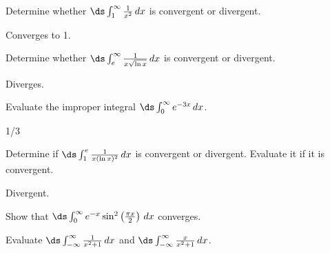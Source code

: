 \begin{enumialphparenastyle}

\begin{ex}
	Determine whether $\ds\int_1^{\infty}\frac{1}{x^2}\,dx$ is convergent or divergent.
	\begin{sol}
		Converges to 1.
	\end{sol}
\end{ex}

\begin{ex}
	Determine whether $\ds\int_e^{\infty}\frac{1}{x\sqrt{\ln x}}\,dx$ is convergent or divergent.
	\begin{sol}
		Diverges.
	\end{sol}
\end{ex}

\begin{ex}
	Evaluate the improper integral $\ds\int_0^{\infty}e^{-3x}\,dx$.
	\begin{sol}
		1/3
	\end{sol}
\end{ex}

\begin{ex}
	Determine if $\ds\int_1^e\frac{1}{x(\ln x)^2}\,dx$ is convergent or divergent. Evaluate it if it is convergent.
	\begin{sol}
		Divergent.
	\end{sol}
\end{ex}

\begin{ex}
	Show that $\ds\int_0^{\infty}e^{-x}\sin^2\left(\frac{\pi x}{2}\right)\,dx$ converges.
\end{ex}

\begin{ex}
	Evaluate $\ds\int_{-\infty}^{\infty}\frac{1}{x^2+1}\,dx$ and $\ds\int_{-\infty}^{\infty}\frac{x}{x^2+1}\,dx$.
\end{ex}


\end{enumialphparenastyle}
